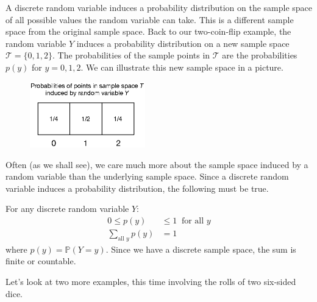 \documentclass[12pt]{article}
\theoremstyle{definition}
\theoremstyle{remark}
\def\P{{\mathbb P}}
\begin{document}
A discrete random variable induces a probability distribution on the sample space of all possible values the random variable can take. This is a different sample space from the original sample space. Back to our two-coin-flip example, the random variable $Y$ induces a probability distribution on a new sample space $\mathcal{T} = \{0, 1, 2\}$. The probabilities of the sample points in $\mathcal{T}$ are the probabilities $p(y)$ for $y = 0, 1, 2$. We can illustrate this new sample space in a picture.

\begin{figure}[H]
\centering
\includegraphics[width=5cm]{induced1.eps}
\end{figure}

Often (as we shall see), we care much more about the sample space induced by a random variable than the underlying sample space. Since a discrete random variable induces a probability distribution, the following must be true.

\begin{framed}
For any discrete random variable $Y$:
\begin{align*}
0 \leq p(y) &\leq 1 \:\text{ for all }y \\
\sum_{\text{all } y} p(y) &= 1
\end{align*}
where $p(y) = \P(Y = y)$. Since we have a discrete sample space, the sum is finite or countable.
\end{framed}

Let's look at two more examples, this time involving the rolls of two six-sided dice.
\end{document}

